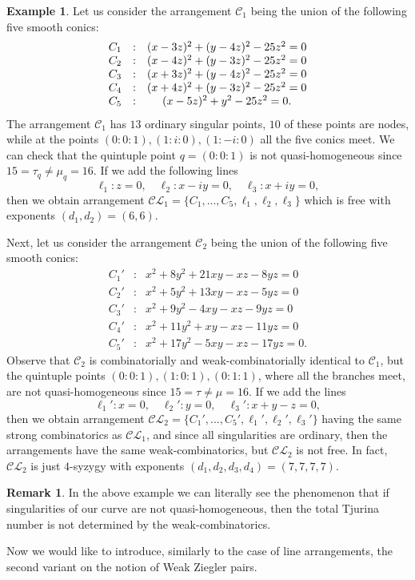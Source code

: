 \documentclass[12pt]{article}
\theoremstyle{plain}
\theoremstyle{definition}
\newtheorem{remark}[thm]{Remark}
\newtheorem{example}[thm]{Example}
\begin{document}
\begin{example}
\label{2bb}
 Let us consider the arrangement $\mathcal{C}_{1}$ being the union of the following five smooth conics:
$$\begin{array}{*{3}c}
C_1& : &(x-3z)^2+(y-4z)^2-25z^2=0 \\
C_2& : &(x-4z)^2+(y-3z)^2-25z^2=0 \\
C_3& : &(x+3z)^2+(y-4z)^2-25z^2=0 \\
C_4& : &(x+4z)^2+(y-3z)^2-25z^2=0 \\
C_5& : &(x-5z)^2+y^2-25z^2=0.
\end{array}$$
The arrangement $\mathcal{C}_{1}$ has $13$ ordinary singular points, $10$ of these
points are nodes, while at the
points $(0:0:1),(1:i:0),(1:-i:0)$ all the five conics meet.
We can check that the quintuple point $q=(0:0:1)$ is not quasi-homogeneous since $15 = \tau_{q} \neq \mu_{q}=16$.
If we add the following lines
$$\ell_{1} : z=0, \quad \ell_{2} : x-iy = 0, \quad \ell_{3} : x+iy =0,$$
then we obtain arrangement $\mathcal{CL}_{1} = \{C_{1}, ..., C_{5}, \ell_{1},\ell_{2},\ell_{3}\}$ which is free with exponents $(d_{1}, d_{2})=(6,6)$.

Next, let us consider the arrangement $\mathcal{C}_{2}$ being the union of the following five smooth conics:
$$\begin{array}{ccl}
C_1'& : &x^2+8y^2+21xy-xz-8yz=0 \\
C_2'& : &x^2+5y^2+13xy-xz-5yz=0 \\
C_3'& : &x^2+9y^2-4xy-xz-9yz=0 \\
C_4'& : &x^2+11y^2+xy-xz-11yz=0 \\
C_5'& : &x^2+17y^2-5xy-xz-17yz=0.
\end{array}$$
Observe that $\mathcal{C}_{2}$ is combinatorially and weak-combinatorially identical to $\mathcal{C}_{1}$, but the quintuple points $(0:0:1),(1:0:1),(0:1:1)$, where all
the branches meet, are not quasi-homogeneous since  $15=\tau \neq \mu=16$.
If we add the lines 
$$\ell_{1}' : x=0, \quad \ell_{2}' : y=0, \quad \ell_{3}' : x+y-z=0,$$
then we obtain arrangement $\mathcal{CL}_{2} = \{C_{1}', ..., C_{5}', \ell_{1}',\ell_{2}',\ell_{3}'\}$ having the same strong combinatorics as $\mathcal{CL}_{1}$, and since all singularities are ordinary, then the arrangements have the same weak-combinatorics, but $\mathcal{CL}_{2}$ is not free. In fact, $\mathcal{CL}_{2}$ is just $4$-syzygy with exponents $(d_{1},d_{2},d_{3},d_{4}) = (7,7,7,7)$.
\end{example}
\begin{remark}
In the above example we can literally see the phenomenon that if singularities of our curve are not quasi-homogeneous, then the total Tjurina number is not determined by the weak-combinatorics.
\end{remark}
Now we would like to introduce, similarly to the case of line arrangements, the second variant on the notion of Weak Ziegler pairs.
\end{document}
